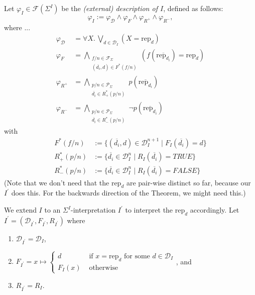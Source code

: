 \documentclass{article}
\begin{document}
Let $\varphi_I \in \mathcal{F}(\Sigma^I)$ be the \emph{(external) description of $I$}, defined as follows:
\begin{equation*}
 \varphi_I := \varphi_\mathcal{D} \land \varphi_F \land \varphi_{R^+} \land \varphi_{R^-},
\end{equation*}
where ...
\begin{equation*}\begin{split}
  \varphi_\mathcal{D} &= \forall X.\, \bigvee_{d \in \mathcal{D}_I} \left( X = \mathrm{rep}_d \right) \\
  \varphi_F &= \bigwedge_{\substack{f/n \in \mathcal{F}_\Sigma\\ (\overline{d_i},d) \in F^*(f/n)}} \left( f(\overline{\mathrm{rep}_{d_i}}) = \mathrm{rep}_d \right) \\
  \varphi_{R^+} &= \bigwedge_{\substack{p/n \in \mathcal{P}_\Sigma\\ \overline{d_i} \in R^*_+(p/n)}} p(\overline{\mathrm{rep}_{d_i}})  \\
  \varphi_{R^-} &= \bigwedge_{\substack{p/n \in \mathcal{P}_\Sigma\\ \overline{d_i} \in R^*_-(p/n)}} \neg p(\overline{\mathrm{rep}_{d_i}})  
\end{split}\end{equation*}
with
\begin{equation*}\begin{split}
  F^*(f/n) &:= \{ (\overline{d_i}, d) \in \mathcal{D}_I^{n+1} \mid F_I(\overline{d_i}) = d \} \\
  R^*_+(p/n) &:= \{ \overline{d_i} \in \mathcal{D}_I^{n} \mid R_I(\overline{d_i}) = \mathit{TRUE} \} \\
  R^*_-(p/n) &:= \{ \overline{d_i} \in \mathcal{D}_I^{n} \mid R_I(\overline{d_i}) = \mathit{FALSE} \} 
\end{split}\end{equation*}
(Note that we don't need that the $\mathrm{rep}_d$ are pair-wise distinct
so far, because our $I^\prime$ does this. For the backwards direction of the Theorem, we might need this.)

We extend $I$ to an $\Sigma^I$-interpretation $I^\prime$ to interpret the $\mathrm{rep}_d$ accordingly. Let $I^\prime = (\mathcal{D}_{I^\prime}, F_{I^\prime}, R_{I^\prime})$ where
\begin{enumerate}
  \item $\mathcal{D}_{I^\prime} = \mathcal{D}_I$, 
  \item $F_{I^\prime} = x \mapsto \begin{cases} d & \text{ if } x = \mathrm{rep}_d \text{ for some } d \in \mathcal{D}_I \\ F_I(x) & \text{ otherwise} \end{cases}$, and
  \item $R_{I^\prime} = R_I$.
\end{enumerate}
\end{document}
